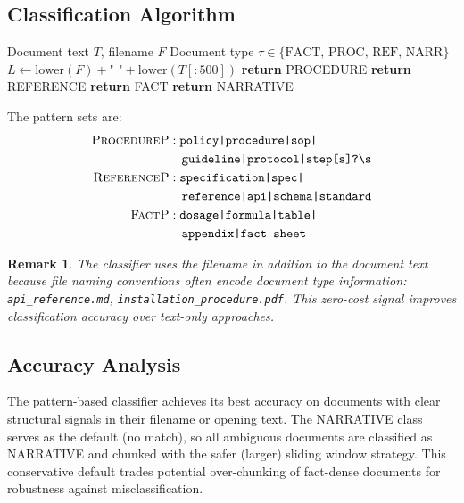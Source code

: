 \documentclass[conference]{IEEEtran}
\newtheorem{remark}{Remark}
\begin{document}
\subsection{Classification Algorithm}

\begin{algorithm}
\caption{Document Type Classification}
\label{alg:classify}
\begin{algorithmic}[1]
\Require Document text $T$, filename $F$
\Ensure Document type $\tau \in \{\text{FACT, PROC, REF, NARR}\}$
\State $L \leftarrow \text{lower}(F) + \texttt{" "} +
       \text{lower}(T[{:}500])$
  \State \textbf{return} PROCEDURE
  \State \textbf{return} REFERENCE
  \State \textbf{return} FACT
\Else
  \State \textbf{return} NARRATIVE
\EndIf
\end{algorithmic}
\end{algorithm}

The pattern sets are:
{\small\begin{align*}
  \textsc{ProcedureP} &:
    \texttt{policy|procedure|sop|}\\
    &\quad\texttt{guideline|protocol|step[s]?\textbackslash s} \\
  \textsc{ReferenceP} &:
    \texttt{specification|spec|}\\
    &\quad\texttt{reference|api|schema|standard} \\
  \textsc{FactP} &:
    \texttt{dosage|formula|table|}\\
    &\quad\texttt{appendix|fact sheet}
\end{align*}}

\begin{remark}
The classifier uses the filename in addition to the document
text because file naming conventions often encode document
type information: \texttt{api\_reference.md},
\texttt{installation\_procedure.pdf}. This zero-cost signal
improves classification accuracy over text-only approaches.
\end{remark}

\subsection{Accuracy Analysis}

The pattern-based classifier achieves its best accuracy
on documents with clear structural signals in their
filename or opening text.  The NARRATIVE class serves as
the default (no match), so all ambiguous documents are
classified as NARRATIVE and chunked with the safer (larger)
sliding window strategy. This conservative default trades
potential over-chunking of fact-dense documents for
robustness against misclassification.
\end{document}
